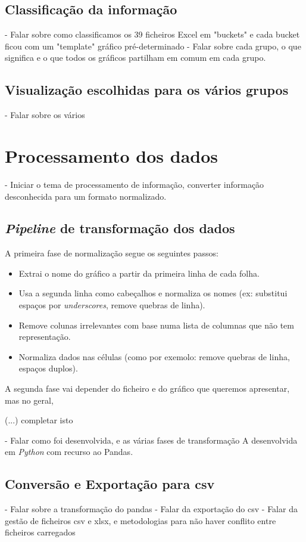\subsection{Classificação da informação}

- Falar sobre como classificamos os 39 ficheiros Excel em "buckets" e cada bucket ficou com um "template" gráfico pré-determinado
- Falar sobre cada grupo, o que significa e o que todos os gráficos partilham em comum em cada grupo.

\subsection{Visualização escolhidas para os vários grupos}
- Falar sobre os vários

\section{Processamento dos dados}
- Iniciar o tema de processamento de informação, converter informação desconhecida para um formato normalizado.

\subsection{\textit{Pipeline} de transformação dos dados}
A primeira fase de normalização segue os seguintes passos:
\begin{itemize}
    \item Extrai o nome do gráfico a partir da primeira linha de cada folha.
    \item Usa a segunda linha como cabeçalhos e normaliza os nomes (ex: substitui espaços por \textit{underscores}, remove quebras de linha).
    \item Remove colunas irrelevantes com base numa lista de columnas que não tem representação.
    \item Normaliza dados nas células (como por exemolo: remove quebras de linha, espaços duplos).
\end{itemize}

A segunda fase vai depender do ficheiro e do gráfico que queremos apresentar, mas no geral,

(...) completar isto

- Falar como foi desenvolvida, e as várias fases  de transformação A desenvolvida em \textit{Python} com recurso ao Pandas. 


\subsection{Conversão e Exportação para \gls{csv}}
- Falar sobre a transformação do pandas\n
- Falar da exportação do \gls{csv}\n
- Falar da gestão de ficheiros  \gls{csv} e \gls{xlsx}, e metodologias para não haver conflito entre ficheiros carregados\n


